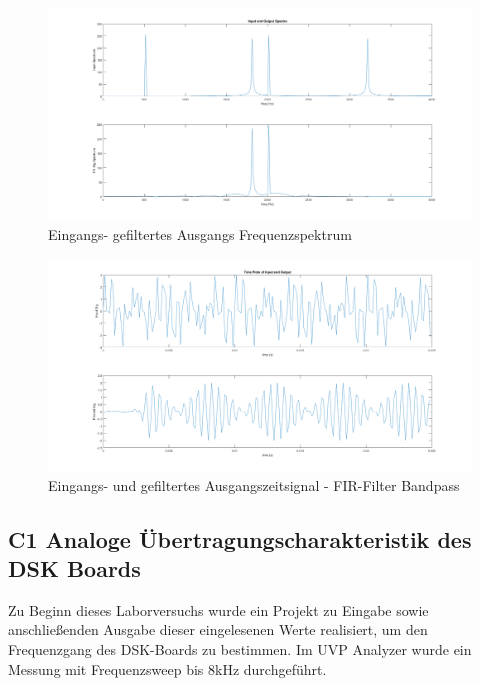 \begin{figure}[H]
\centering
\includegraphics[width=1.0\linewidth]{./Bilder/Attachment_B_fir_3_Spektrum}
\caption{Eingangs- gefiltertes Ausgangs Frequenzspektrum}
\label{fig:Attachment_B_fir_3_Spektrum}
\end{figure}


\begin{figure}[H]
\centering
\includegraphics[width=1.0\linewidth]{./Bilder/Attachment_B_fir_3_Timeplot}
\caption{Eingangs- und gefiltertes Ausgangszeitsignal  - FIR-Filter Bandpass}
\label{fig:Attachment_B_fir_3_Timeplot}
\end{figure}

\newpage

\subsection{C1 Analoge Übertragungscharakteristik des DSK Boards}
\noindent Zu Beginn dieses Laborversuchs wurde ein Projekt zu Eingabe sowie anschließenden Ausgabe dieser eingelesenen Werte realisiert, um den Frequenzgang des DSK-Boards zu bestimmen. Im UVP Analyzer wurde ein Messung mit Frequenzsweep bis 8kHz durchgeführt.

